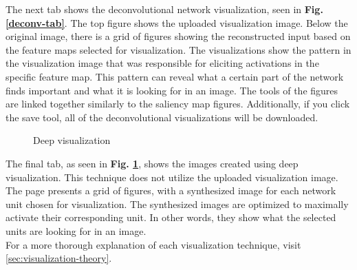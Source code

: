 \noindent The next tab shows the deconvolutional network visualization, seen in \textbf{Fig. \ref{deconv-tab}}. The top figure shows the uploaded visualization image. Below the original image, there is a grid of figures showing the reconstructed input based on the feature maps selected for visualization. The visualizations show the pattern in the visualization image that was responsible for eliciting activations in the specific feature map. This pattern can reveal what a certain part of the network finds important and what it is looking for in an image. The tools of the figures are linked together similarly to the saliency map figures. Additionally, if you click the save tool, all of the deconvolutional visualizations will be downloaded.\\

\begin{figure}[!h]
    \centering
        \caption{Deep visualization}
        \label{deepvis-tab}
\end{figure}

\noindent The final tab, as seen in \textbf{Fig. \ref{deepvis-tab}}, shows the images created using deep visualization. This technique does not utilize the uploaded visualization image. The page presents a grid of figures, with a synthesized image for each network unit chosen for visualization. The synthesized images are optimized to maximally activate their corresponding unit. In other words, they show what the selected units are looking for in an image. \\

\noindent For a more thorough explanation of each visualization technique, visit \autoref{sec:visualization-theory}.

\cleardoublepage